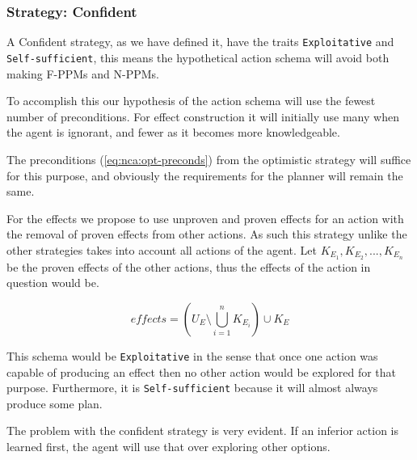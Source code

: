 \documentclass[../Master.tex]{subfiles}
\begin{document}
\subsubsection{Strategy: Confident}

A Confident strategy, as we have defined it, have the traits \texttt{Exploitative} and \texttt{Self-sufficient},
this means the hypothetical action schema will avoid both making F-PPMs and N-PPMs. 

To accomplish this our hypothesis of the action schema will use the fewest number of preconditions.
For effect construction it will initially use many when the agent is ignorant, and fewer as it becomes more knowledgeable. 

The preconditions (\ref{eq:nca:opt-preconds}) from the optimistic strategy will suffice for this purpose, and obviously the requirements for the planner will remain the same.

For the effects we propose to use unproven and proven effects for an action with the removal of proven effects from other actions. 
As such this strategy unlike the other strategies takes into account all actions of the agent.
Let $K_{E_1},K_{E_2},...,K_{E_n}$ be the proven effects of the other actions, thus the effects of the action in question would be.

\begin{equation}
		effects = \left( U_E \setminus \bigcup \limits_{i = 1} ^n K_{E_i} \right) \cup K_E
\end{equation}

This schema would be \texttt{Exploitative} in the sense that once one action was capable of producing an effect then no other action would be explored for that purpose. 
Furthermore, it is \texttt{Self-sufficient} because it will almost always produce some plan.

The problem with the confident strategy is very evident. If an inferior action is learned first, the agent will use that over exploring other options.
\end{document}
